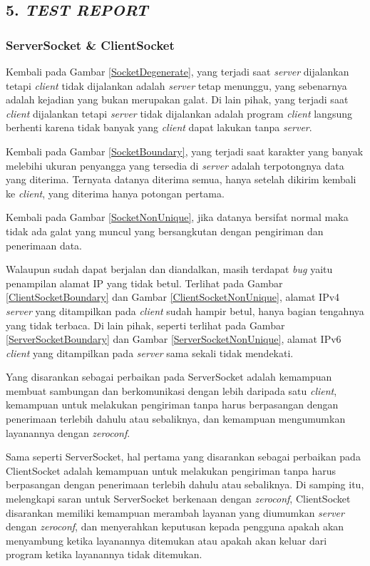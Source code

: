 \subsection*{\textcolor{subsectioncolor}{\textsf{5. \textit{TEST REPORT}}}}


\subsubsection*{ServerSocket \& ClientSocket}

Kembali pada Gambar \ref{SocketDegenerate},
yang terjadi saat \textit{server} dijalankan tetapi \textit{client} tidak dijalankan adalah \textit{server} tetap menunggu, yang sebenarnya adalah kejadian yang bukan merupakan galat.
Di lain pihak, yang terjadi saat \textit{client} dijalankan tetapi \textit{server} tidak dijalankan adalah program \textit{client} langsung berhenti karena tidak banyak yang \textit{client} dapat lakukan tanpa \textit{server}.

Kembali pada Gambar \ref{SocketBoundary},
yang terjadi saat karakter yang banyak melebihi ukuran penyangga yang tersedia di \textit{server} adalah terpotongnya data yang diterima.
Ternyata datanya diterima semua, hanya setelah dikirim kembali ke \textit{client},
yang diterima hanya potongan pertama.

Kembali pada Gambar \ref{SocketNonUnique},
jika datanya bersifat normal maka tidak ada galat yang muncul yang bersangkutan dengan pengiriman dan penerimaan data.

Walaupun sudah dapat berjalan dan diandalkan,
masih terdapat \textit{bug} yaitu penampilan alamat IP yang tidak betul.
Terlihat pada Gambar \ref{ClientSocketBoundary} dan Gambar \ref{ClientSocketNonUnique},
alamat IPv4 \textit{server} yang ditampilkan pada \textit{client} sudah hampir betul,
hanya bagian tengahnya yang tidak terbaca.
Di lain pihak, seperti terlihat pada Gambar \ref{ServerSocketBoundary} dan Gambar \ref{ServerSocketNonUnique},
alamat IPv6 \textit{client} yang ditampilkan pada \textit{server} sama sekali tidak mendekati.

Yang disarankan sebagai perbaikan pada ServerSocket adalah kemampuan membuat sambungan dan berkomunikasi dengan lebih daripada satu \textit{client},
kemampuan untuk melakukan pengiriman tanpa harus berpasangan dengan penerimaan terlebih dahulu atau sebaliknya,
dan kemampuan mengumumkan layanannya dengan \textit{zeroconf}.

Sama seperti ServerSocket, hal pertama yang disarankan sebagai perbaikan pada ClientSocket adalah kemampuan untuk melakukan pengiriman tanpa harus berpasangan dengan penerimaan terlebih dahulu atau sebaliknya.
Di samping itu, melengkapi saran untuk ServerSocket berkenaan dengan \textit{zeroconf},
ClientSocket disarankan memiliki kemampuan merambah layanan yang diumumkan \textit{server} dengan \textit{zeroconf},
dan menyerahkan keputusan kepada pengguna apakah akan menyambung ketika layanannya ditemukan atau apakah akan keluar dari program ketika layanannya tidak ditemukan.


